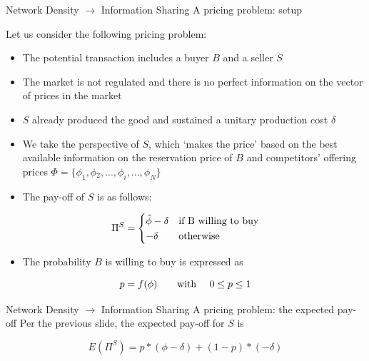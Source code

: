 \documentclass[notes, aspectratio=1610]{beamer}
\begin{document}
\begin{frame}
	{Network Density $\rightarrow$ Information Sharing}
	{A pricing problem: setup}
	\begin{small}
	Let us consider the following pricing problem:
	\begin{itemize}
		\item The potential transaction includes a buyer $B$ and a 
		seller $S$ 
		\item The market is not regulated and there is no perfect 
		information on the vector of prices in the market
		\item $S$ already produced the good and sustained a unitary 
		production cost $\delta$
		\item We take the perspective of $S$, which `makes the price' 
		based on the best available information on the reservation 
		price of $B$ and competitors'
		offering prices $\Phi = \{\phi_{1}, \phi{_2}, ..., \phi_{i},
		..., \phi_{N}\}$
		\item The pay-off of $S$ is as follows:
	\end{itemize}
	\[
		\Pi^{S}=
		\begin{dcases}
			\hat\phi - \delta & \text{if B willing to buy}\\
			-\delta                            & \text{otherwise}\\
		\end{dcases}
	\]
	\begin{itemize}
		\item 
		The probability $B$ is willing to buy is expressed as
	\end{itemize}	

		\begin{equation*}
			p = f(\phi) \text{\quad \quad with \quad } 0 \leq  p \leq 1 
		\end{equation*}
	\end{small}
\end{frame}

\begin{frame}
	{Network Density $\rightarrow$ Information Sharing}
	{A pricing problem: the expected pay-off}
	Per the previous slide, the expected pay-off for $S$ is

	\begin{equation*}
		E(\Pi^{S}) = p * (\phi - \delta) + (1 - p) * (- \delta)
	\end{equation*}

	\begin{figure}
		\begin{center}
			
		\end{center}
	\end{figure}
	
\end{frame}
\end{document}
